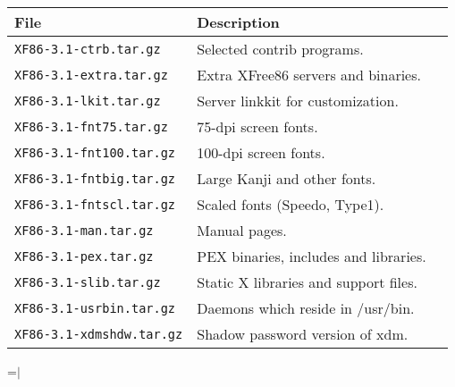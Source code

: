 {\newpage
\clearpage
\samepage \begin{tabular}{lll} 
\hline
File					& Description     \\ 
\hline
{\tt XF86-3.1-ctrb.tar.gz}    		& Selected contrib programs. \\ 
{\tt XF86-3.1-extra.tar.gz}   		& Extra XFree86 servers and binaries. \\ 
{\tt XF86-3.1-lkit.tar.gz}    		& Server linkkit for customization. \\ 
{\tt XF86-3.1-fnt75.tar.gz}   		& 75-dpi screen fonts. \\ 
{\tt XF86-3.1-fnt100.tar.gz} 		&  100-dpi screen fonts. \\ 
{\tt XF86-3.1-fntbig.tar.gz}		&   Large Kanji and other fonts. \\ 
{\tt XF86-3.1-fntscl.tar.gz}  		& Scaled fonts (Speedo, Type1). \\ 
{\tt XF86-3.1-man.tar.gz}     		& Manual pages. \\ 
{\tt XF86-3.1-pex.tar.gz}     		& PEX binaries, includes and libraries. \\ 
{\tt XF86-3.1-slib.tar.gz}    		& Static X libraries and support files. \\ 
{\tt XF86-3.1-usrbin.tar.gz}  		& Daemons which reside in /usr/bin. \\ 
{\tt XF86-3.1-xdmshdw.tar.gz} 		& Shadow password version of xdm. \\ 
\hline
\end{tabular}
}

{\newpage
\clearpage
\samepage \setbox\sizebox=\hbox{$\mid$}\box\sizebox
}

{\newpage
\clearpage
\samepage {}
}

{\newpage
\clearpage
\samepage {}
}

{\newpage
\clearpage
\samepage {}
}

{\newpage
\clearpage
\samepage {}
}

{\newpage
\clearpage
\samepage {}
}

{\newpage
\clearpage
\samepage {}
}

{\newpage
\clearpage
\samepage {}
}

{\newpage
\clearpage
\samepage {}
}

{\newpage
\clearpage
\samepage {}
}


